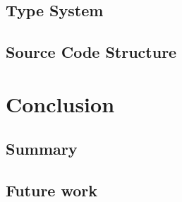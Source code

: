 \documentclass[declaration,shortabstract]{iithesis}
\begin{document}
\section{Type System}
\section{Source Code Structure}

\chapter{Conclusion}
\section{Summary}
\section{Future work}



\printbibliography
\end{document}
